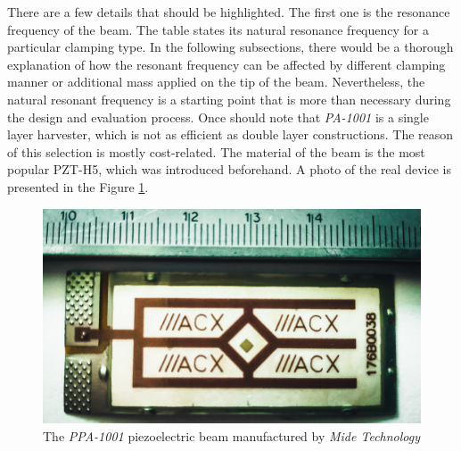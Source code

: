 \documentclass[12pt,a4paper]{article}
\begin{document}
There are a few details that should be highlighted. The first one is the resonance frequency of the beam. The table states its natural resonance frequency for a particular clamping type. In the following subsections, there would be a thorough explanation of how the resonant frequency can be affected by different clamping manner or additional mass applied on the tip of the beam. Nevertheless, the natural resonant frequency is a starting point that is more than necessary during the design and evaluation process. Once should note that \textit{PA-1001} is a single layer harvester, which is not as efficient as double layer constructions. The reason of this selection is mostly cost-related. The material of the beam is the most popular PZT-H5, which was introduced beforehand. A photo of the real device is presented in the Figure \ref{fig:ppa}.

\begin{figure}[ht!]
\includegraphics[scale=0.1]{ppa.jpg}
\caption{The \textit{PPA-1001} piezoelectric beam manufactured by \textit{Mide Technology}}
\label{fig:ppa}
\end{figure}
\end{document}
